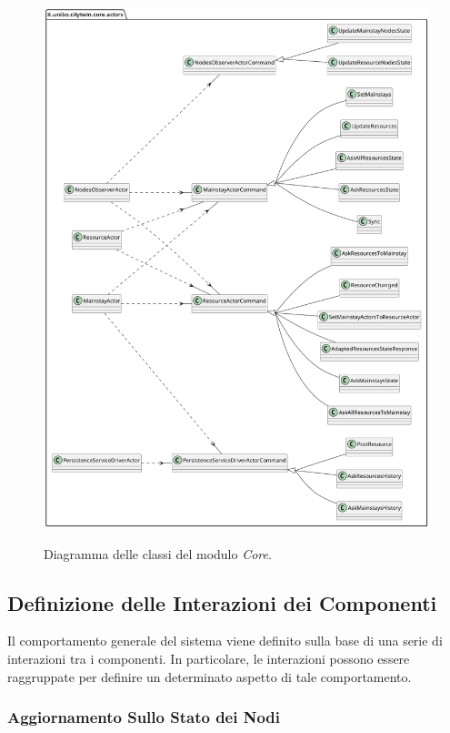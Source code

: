 \documentclass[12pt]{article}
\begin{document}
\begin{figure}[H]
    \caption{Diagramma delle classi del modulo \textit{Core}.}
    \includegraphics[width=\textwidth]{../assets/images/core-class-diagram.png}
    \label{fig:core-class-diagram}
\end{figure}

\subsection{Definizione delle Interazioni dei Componenti}

Il comportamento generale del sistema viene definito sulla base di una serie di interazioni tra i componenti. In particolare, le interazioni possono essere raggruppate per definire un determinato aspetto di tale comportamento.

\subsubsection{Aggiornamento Sullo Stato dei Nodi}
\end{document}

